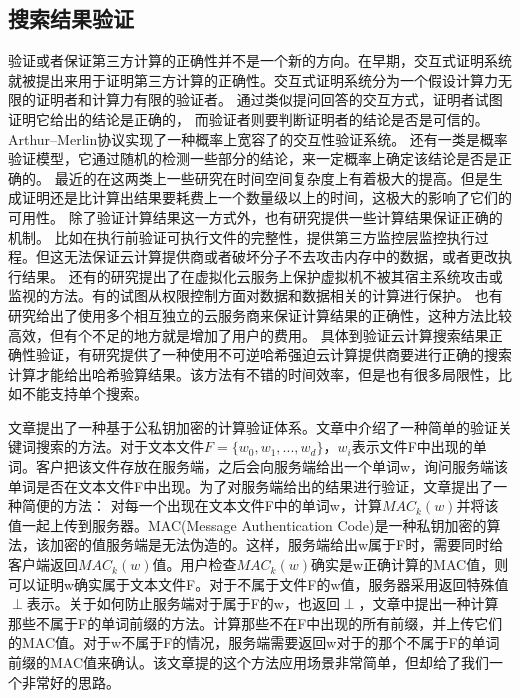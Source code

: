 \subsection{搜索结果验证}
验证或者保证第三方计算的正确性并不是一个新的方向。在早期，交互式证明系统就被提出来用于证明第三方计算的正确性。交互式证明系统分为一个假设计算力无限的证明者和计算力有限的验证者。
通过类似提问回答的交互方式，证明者试图证明它给出的结论是正确的，
而验证者则要判断证明者的结论是否是可信的。Arthur–Merlin协议实现了一种概率上宽容了的交互性验证系统。
还有一类是概率验证模型，它通过随机的检测一些部分的结论，来一定概率上确定该结论是否是正确的。
最近的在这两类上一些研究在时间空间复杂度上有着极大的提高。但是生成证明还是比计算出结果要耗费上一个数量级以上的时间，这极大的影响了它们的可用性。
除了验证计算结果这一方式外，也有研究提供一些计算结果保证正确的机制。
比如在执行前验证可执行文件的完整性，提供第三方监控层监控执行过程。但这无法保证云计算提供商或者破坏分子不去攻击内存中的数据，或者更改执行结果。
还有的研究提出了在虚拟化云服务上保护虚拟机不被其宿主系统攻击或监视的方法。有的试图从权限控制方面对数据和数据相关的计算进行保护。
也有研究给出了使用多个相互独立的云服务商来保证计算结果的正确性，这种方法比较高效，但有个不足的地方就是增加了用户的费用。
具体到验证云计算搜索结果正确性验证，有研究提供了一种使用不可逆哈希强迫云计算提供商要进行正确的搜索计算才能给出哈希验算结果。该方法有不错的时间效率，但是也有很多局限性，比如不能支持单个搜索。

文章\cite{benabbas2011verifiable}提出了一种基于公私钥加密的计算验证体系。文章中介绍了一种简单的验证关键词搜索的方法。对于文本文件$F = \{w_0,w_1,...,w_d\}$，$w_i$表示文件F中出现的单词。客户把该文件存放在服务端，之后会向服务端给出一个单词w，询问服务端该单词是否在文本文件F中出现。为了对服务端给出的结果进行验证，文章提出了一种简便的方法：
对每一个出现在文本文件F中的单词w，计算$MAC_k(w)$并将该值一起上传到服务器。MAC(Message Authentication Code)是一种私钥加密的算法，该加密的值服务端是无法伪造的。这样，服务端给出w属于F时，需要同时给客户端返回$MAC_k(w)$值。用户检查$MAC_k(w)$确实是w正确计算的MAC值，则可以证明w确实属于文本文件F。对于不属于文件F的w值，服务器采用返回特殊值$\perp$表示。关于如何防止服务端对于属于F的w，也返回$\perp$，文章中提出一种计算那些不属于F的单词前缀的方法。计算那些不在F中出现的所有前缀，并上传它们的MAC值。对于w不属于F的情况，服务端需要返回w对于的那个不属于F的单词前缀的MAC值来确认。该文章提的这个方法应用场景非常简单，但却给了我们一个非常好的思路。

